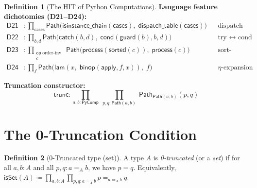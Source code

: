 \documentclass[11pt,a4paper]{report}
\theoremstyle{definition}
\newtheorem{definition}{Definition}[chapter]
\theoremstyle{plain}
\newcommand{\Path}{\mathsf{Path}}
\begin{document}
\begin{definition}[The HIT of Python Computations]
\smallskip
\noindent\textbf{Language feature dichotomies (D21--D24):}
\begin{align}
  \mathsf{D21} &: \prod_{\mathsf{cases}}
    \Path\bigl(\mathsf{isinstance\_chain}(\mathsf{cases}),\;
    \mathsf{dispatch\_table}(\mathsf{cases})\bigr)
    & &\text{dispatch} \\
  \mathsf{D22} &: \prod_{b, d}
    \Path\bigl(\mathsf{catch}(b, d),\;
    \mathsf{cond}(\mathsf{guard}(b), b, d)\bigr)
    & &\text{try $\leftrightarrow$ cond} \\
  \mathsf{D23} &: \prod_{\substack{\mathsf{op}\;\text{order-inv.} \\ c}}
    \Path\bigl(\mathsf{process}(\mathsf{sorted}(c)),\;
    \mathsf{process}(c)\bigr)
    & &\text{sort-process} \\
  \mathsf{D24} &: \prod_{f}
    \Path\bigl(\mathsf{lam}(x,\; \mathsf{binop}(\mathsf{apply}, f, x)),\; f\bigr)
    & &\text{$\eta$-expansion}
\end{align}

\textbf{Truncation constructor:}
\begin{equation}
  \mathsf{trunc} : \prod_{a,b : \mathsf{PyComp}}\;
    \prod_{p, q : \Path(a, b)}\; \Path_{\Path(a,b)}(p, q)
\end{equation}
\end{definition}

\section{The 0-Truncation Condition}

\begin{definition}[0-Truncated type (set)]
\label{def:set-truncation}
A type $A$ is \emph{0-truncated} (or a \emph{set}) if for all
$a, b : A$ and all $p, q : a =_A b$, we have $p = q$.
Equivalently, $\mathsf{isSet}(A) \coloneqq
\prod_{a,b : A}\prod_{p,q : a =_A b} p =_{a =_A b} q$.
\end{definition}
\end{document}
